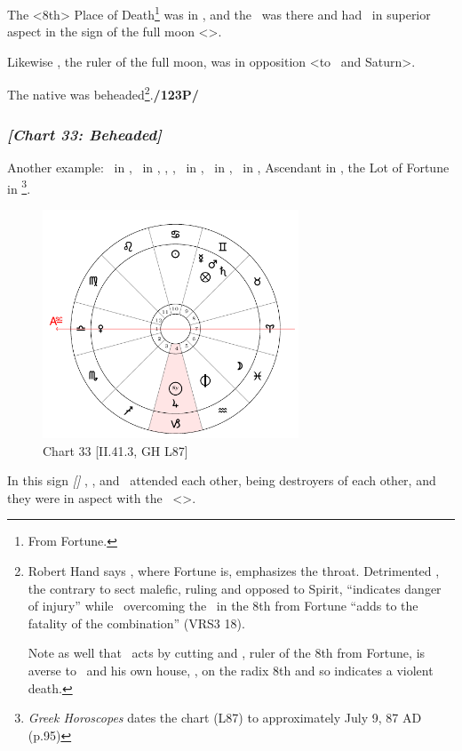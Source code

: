 The <8th> Place of Death\footnote{From Fortune.} was in \Sagittarius, and the \Moon\, was there and had \Saturn\, in superior aspect in the sign of the full moon <\Virgo>. 

Likewise \Mercury, the ruler of the full moon, was in opposition <to \Virgo\, and Saturn>. 

The native was beheaded\footnote{Robert Hand says \Taurus, where Fortune is, emphasizes the throat. Detrimented \Mars, the contrary to sect malefic, ruling and opposed to Spirit, ``indicates danger of injury'' while \Saturn\, overcoming the \Moon\, in the 8th from Fortune ``adds to the fatality of the combination'' (VRS3 18).

Note as well that \Mars\, acts by cutting and \Jupiter, ruler of the 8th from Fortune, is averse to \Mars\, and his own house, \Pisces, on the radix 8th and so indicates a violent death.}.\textbf{/123P/} 
\newpage
\subsubsection{\textit{[Chart 33: Beheaded]}}
Another example: \Sun\, in \Cancer, \Moon\, in \Pisces, \Saturn, \Mars, \Mercury\, in \Gemini, \Jupiter\, in \Capricorn, \Venus\, in \Leo, Ascendant in \Libra, the Lot of Fortune in \Gemini
\footnote{\textit{Greek Horoscopes} dates the chart (L87) to approximately July 9, 87 AD (p.95)}.

\clearpage
\begin{figure}
\centering
\includegraphics[width=0.68\textwidth]{charts/2_41_3}
\caption{Chart 33 [II.41.3, GH L87]}
\label{fig:chart33}
\end{figure} 

In this sign \textsl{[\Gemini]} \Saturn, \Mercury, and \Mars\, attended each other, being destroyers of each other, and they were in aspect with the \Moon\, <\Square>. 

